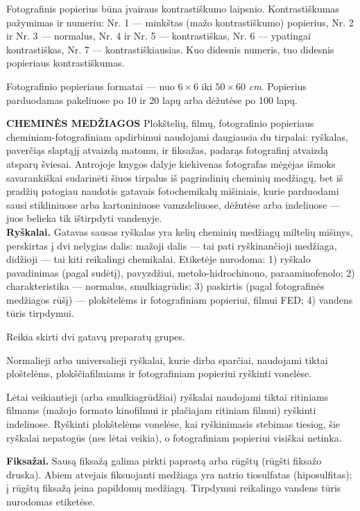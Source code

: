 \documentclass{book}
\begin{document}
					Fotografinis popierius būna įvairaus kontrastiškumo laipsnio. Kontrastiškumas pažymimas ir numeriu: Nr. 1 --- minkštas (mažo kontrastiškumo) popierius, Nr. 2 ir Nr. 3 --- normalus, Nr. 4 ir Nr. 5 --- kontrastiškas, Nr. 6 --- ypatingai kontrastiškas, Nr. 7 --- kontrastiškiausias. Kuo didesnis numeris, tuo didesnis popieriaus kontrastiškumas.

					Fotografinio popieriaus formatai --- nuo $6 \times 6$ iki $50 \times 60$ \textit{cm}. Popierius parduodamas pakeliuose po 10 ir 20 lapų arba dėžutėse po 100 lapų.

				\textbf{CHEMINĖS MEDŽIAGOS}
				Plokštelių, filmų, fotografinio popieriaus cheminiam-fotografiniam apdirbimui naudojami daugiausia du tirpalai: ryškalas, paverčiąs slaptąjį atvaizdą matomu, ir fiksažas, padarąs fotografinį atvaizdą atsparų šviesai. Antrojoje knygos dalyje kiekivenas fotografas mėgėjas išmoks savarankiškai sudarinėti šiuos tirpalus iš pagrindinių cheminių medžiagų, bet iš pradžių patogiau naudotis gatavais fotochemikalų mišiniais, kurie parduodami sausi stikliniuose arba kartoniniuose vamzdeliuose, dėžutėse arba indeliuose --- juos belieka tik ištirpdyti vandenyje.\\

				\textbf{Ryškalai.} Gatavas sausas ryškalas yra kelių cheminių medžiagų miltelių mišinys, perskirtas į dvi nelygias dalis: mažoji dalis --- tai pati ryškinančioji medžiaga, didžioji --- tai kiti reikalingi chemikalai. Etiketėje nurodoma: 1) ryškalo pavadinimas (pagal sudėtį), pavyzdžiui, metolo-hidrochinono, paraaminofenolo; 2) charakteristika --- normalus, smulkiagrūdis; 3) paskirtis (pagal fotografinės medžiagos rūšį) --- plokštelėms ir fotografiniam popieriui, filmui FED; 4) vandens tūris tirpdymui.

				Reikia skirti dvi gatavų preparatų grupes.

				Normalieji arba universalieji ryškalai, kurie dirba sparčiai, naudojami tiktai ploštelėms, plokščiafilmiams ir fotografiniam popieriui ryškinti vonelėse.

				Lėtai veikiantieji (arba smulkiagrūdžiai) ryškalai naudojami tiktai ritiniams filmams (mažojo formato kinofilmui ir plačiajam ritiniam filmui) ryškinti indeliuose. Ryškinti plokštelėms vonelėse, kai ryškinimasis stebimas tiesiog, šie ryškalai nepatogūs (nes lėtai veikia), o fotografiniam popieriui visiškai netinka.

				\textbf{Fiksažai.} Sausą fiksažą galima pirkti paprastą arba rūgštų (rūgšti fiksažo druska). Abiem atvejais fiksuojanti medžiaga yra natrio tiosulfatas (hiposulfitas); į rūgštų fiksažą įeina papildomų medžiagų. Tirpdymui reikalingo vandens tūris nurodomas etiketėse.
\end{document}
